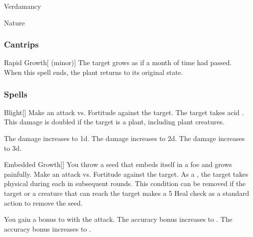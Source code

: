\newpage
\begin{spellsection}{Verdamancy}

\begin{spellheader}
\end{spellheader}


 Nature

\subsubsection{Cantrips}


\begin{freeability}{Rapid Growth}[ (minor)]
The target grows as if a month of time had passed.
When this spell ends, the plant returns to its original state.
\end{freeability}

\end{spellsection}


\subsubsection{Spells}


\lowercase{\hypertarget{spell:Blight}{}}\label{spell:Blight}
\begin{freeability}[Rank 1]{\hypertarget{spell:Blight}{Blight}}[]
Make an attack vs. Fortitude against the target.
\hit The target takes acid .
This damage is doubled if the target is a plant, including plant creatures.

\rankline
{} The damage increases to  \plus1d.
 The damage increases to  \plus2d.
 The damage increases to  \plus3d.
\end{freeability}
\vspace{0.25em}



\lowercase{\hypertarget{spell:Embedded Growth}{}}\label{spell:Embedded Growth}
\begin{freeability}[Rank 1]{\hypertarget{spell:Embedded Growth}{Embedded Growth}}[]
You throw a seed that embeds itself in a foe and grows painfully.
Make an attack vs. Fortitude against the target.
\hit As a , the target takes physical  during each  in subsequent rounds.
This condition can be removed if the target or a creature that can reach the target makes a  5 Heal check as a standard action to remove the seed.

\rankline
{} You gain a  bonus to  with the attack.
 The accuracy bonus increases to .
 The accuracy bonus increases to .
\end{freeability}
\vspace{0.25em}




